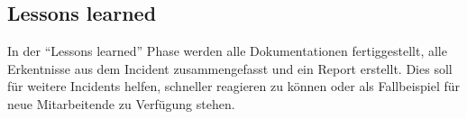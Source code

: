 \subsection{Lessons learned}
In der ``Lessons learned'' Phase werden alle Dokumentationen fertiggestellt, alle Erkentnisse aus dem Incident zusammengefasst und ein Report erstellt.
Dies soll für weitere Incidents helfen, schneller reagieren zu können oder als Fallbeispiel für neue Mitarbeitende zu Verfügung stehen. 